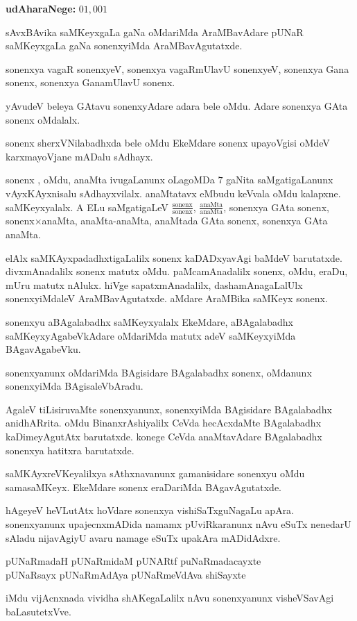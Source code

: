 \textbf{udAharaNege:} $01,001$

sAvxBAvika saMKeyxgaLa gaNa oMdariMda AraMBavAdare pUNaR saMKeyxgaLa gaNa sonenx\-yiMda AraMBavAgutatxde.

sonenxya vagaR sonenxyeV, sonenxya vagaRmUlavU sonenxyeV, sonenxya Gana sonenx, sonenxya GanamUlavU sonenx.

yAvudeV beleya GAtavu sonenxyAdare adara bele oMdu. Adare sonenxya GAta sonenx oMdalalx.

sonenx sherxVNilabadhxda bele oMdu EkeMdare sonenx upayoVgisi oMdeV karxma\-yoVjane mADalu sAdhayx.

sonenx , oMdu, anaMta ivugaLanunx oLagoMDa $7$ gaNita saMgatigaLanunx vAyxKAyx\-nisalu sAdhayxvilalx. anaMtatavx eMbudu keVvala oMdu kalapxne. saMKeyxyalalx. A ELu saMgatigaLeV $\frac{\text{sonenx}}{\text{sonenx}}$, $\frac{\text{anaMta}}{\text{anaMta}}$, sonenxya GAta sonenx, sonenx$\times$anaMta, anaMta-anaMta, anaMtada GAta sonenx, sonenxya GAta anaMta.

elAlx saMKAyxpadadhxtigaLalilx sonenx kaDADxyavAgi baMdeV barutatxde. divxmAnadalilx sonenx matutx oMdu. paMcamAnadalilx sonenx, oMdu, eraDu, mUru matutx nAlukx. hiVge sapatxmAnadalilx, dashamAnagaLalUlx sonenxyiMdaleV AraMBavAgutatxde. aMdare AraMBika saMKeyx sonenx.

sonenxyu aBAgalabadhx saMKeyxyalalx EkeMdare, aBAgalabadhx saMKeyxyAgabeVkAdare oMdariMda matutx adeV saMKeyxyiMda BAgavAgabeVku.

sonenxyanunx oMdariMda BAgisidare BAgalabadhx sonenx, oMdanunx sonenxyiMda BAgisaleVbAradu.

AgaleV tiLisiruvaMte sonenxyanunx, sonenxyiMda BAgisidare BAgalabadhx anidhAR\-rita. oMdu BinanxrAshiyalilx CeVda hecAcxdaMte BAgalabadhx kaDimeyAgutAtx barutatxde. konege CeVda anaMtavAdare BAgalabadhx sonenxya hatitxra barutatxde.

saMKAyxreVKeyalilxya sAthxnavanunx gamanisidare sonenxyu oMdu samasaMKeyx. EkeMdare sonenx eraDariMda BAgavAgutatxde.

hAgeyeV heVLutAtx hoVdare sonenxya vishiSaTxguNagaLu apAra. sonenxyanunx upajecnxmADida namamx pUviRkaranunx nAvu eSuTx nenedarU sAladu nijavAgiyU avaru namage eSuTx upakAra mADidAdxre.
\begin{center}
pUNaRmadaH pUNaRmidaM pUNARtf puNaRmadacayxte\\
pUNaRsayx pUNaRmAdAya pUNaRmeVdAva shiSayxte 
\end{center}

iMdu vijAcnxnada vividha shAKegaLalilx nAvu sonenxyanunx visheVSavAgi baLasutetxVve.

